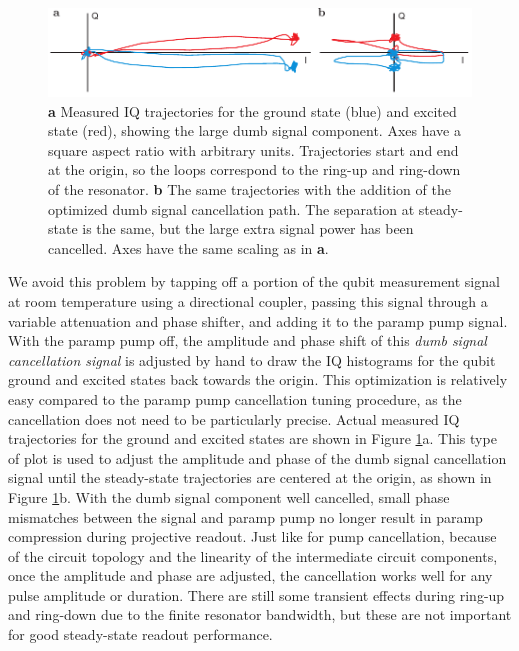 \begin{figure}
\begin{center}
	\includegraphics[width = 6in]{qfb_exp_chapter/dumb_sig_exp}
\end{center}
\caption[Dumb signal cancellation data]{\textbf{a} Measured IQ trajectories for the ground state (blue) and excited state (red), showing the large dumb signal component.  Axes have a square aspect ratio with arbitrary units.  Trajectories start and end at the origin, so the loops correspond to the ring-up and ring-down of the resonator.  \textbf{b} The same trajectories with the addition of the optimized dumb signal cancellation path.  The separation at steady-state is the same, but the large extra signal power has been cancelled.  Axes have the same scaling as in \textbf{a}.}
\label{fig:dumb_sig_exp}
\end{figure}

We avoid this problem by tapping off a portion of the qubit measurement signal at room temperature using a directional coupler, passing this signal through a variable attenuation and phase shifter, and adding it to the paramp pump signal.  With the paramp pump off, the amplitude and phase shift of this \textit{dumb signal cancellation signal} is adjusted by hand to draw the IQ histograms for the qubit ground and excited states back towards the origin.  This optimization is relatively easy compared to the paramp pump cancellation tuning procedure, as the cancellation does not need to be particularly precise.  Actual measured IQ trajectories for the ground and excited states are shown in Figure \ref{fig:dumb_sig_exp}a.  This type of plot is used to adjust the amplitude and phase of the dumb signal cancellation signal until the steady-state trajectories are centered at the origin, as shown in Figure \ref{fig:dumb_sig_exp}b.  With the dumb signal component well cancelled, small phase mismatches between the signal and paramp pump no longer result in paramp compression during projective readout.  Just like for pump cancellation, because of the circuit topology and the linearity of the intermediate circuit components, once the amplitude and phase are adjusted, the cancellation works well for any pulse amplitude or duration.  There are still some transient effects during ring-up and ring-down due to the finite resonator bandwidth, but these are not important for good steady-state readout performance.


